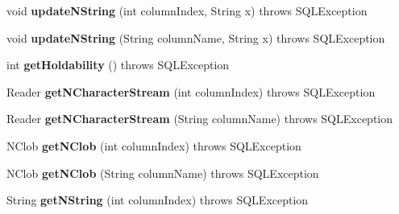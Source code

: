 \begin{DoxyCompactItemize}
void {\bfseries update\+N\+String} (int column\+Index, String x)  throws S\+Q\+L\+Exception 
\item 
\mbox{\label{classcom_1_1mysql_1_1cj_1_1jdbc_1_1result_1_1_updatable_result_set_a0997a9e9b40649a0b8e1c1f762103556}} 
void {\bfseries update\+N\+String} (String column\+Name, String x)  throws S\+Q\+L\+Exception 
\item 
\mbox{\label{classcom_1_1mysql_1_1cj_1_1jdbc_1_1result_1_1_updatable_result_set_af7d913925e20063e601f07a7a09f4f22}} 
int {\bfseries get\+Holdability} ()  throws S\+Q\+L\+Exception 
\item 
\mbox{\label{classcom_1_1mysql_1_1cj_1_1jdbc_1_1result_1_1_updatable_result_set_abbd7a36aeac63d61e5469bf5b19295f9}} 
Reader {\bfseries get\+N\+Character\+Stream} (int column\+Index)  throws S\+Q\+L\+Exception 
\item 
\mbox{\label{classcom_1_1mysql_1_1cj_1_1jdbc_1_1result_1_1_updatable_result_set_ae5d09f6e7e85bfb4a5b5e5c6cf95971d}} 
Reader {\bfseries get\+N\+Character\+Stream} (String column\+Name)  throws S\+Q\+L\+Exception 
\item 
\mbox{\label{classcom_1_1mysql_1_1cj_1_1jdbc_1_1result_1_1_updatable_result_set_a1405b7a7ea5411d134d475ea9f4e8c83}} 
N\+Clob {\bfseries get\+N\+Clob} (int column\+Index)  throws S\+Q\+L\+Exception 
\item 
\mbox{\label{classcom_1_1mysql_1_1cj_1_1jdbc_1_1result_1_1_updatable_result_set_a613fcd720670506a9bbd41a79af8c8b4}} 
N\+Clob {\bfseries get\+N\+Clob} (String column\+Name)  throws S\+Q\+L\+Exception 
\item 
\mbox{\label{classcom_1_1mysql_1_1cj_1_1jdbc_1_1result_1_1_updatable_result_set_a625171b17bca456e536a06c953549893}} 
String {\bfseries get\+N\+String} (int column\+Index)  throws S\+Q\+L\+Exception 

\end{DoxyCompactItemize}
